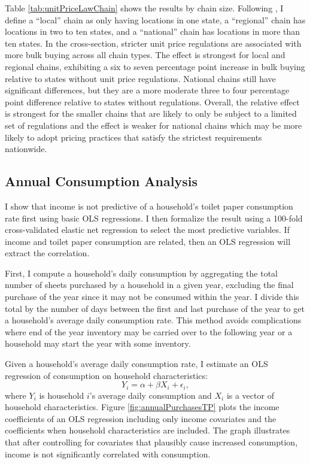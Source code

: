 \documentclass[AER]{AEA_mal}
\begin{document}


Table \ref{tab:unitPriceLawChain} shows the results by chain size. Following \citet{jarmin2009}, I define a ``local'' chain as only having locations in one state, a ``regional'' chain has locations in two to ten states, and a ``national'' chain has locations in more than ten states. In the cross-section, stricter unit price regulations are associated with more bulk buying across all chain types. The effect is strongest for local and regional chains, exhibiting a six to seven percentage point increase in bulk buying relative to states without unit price regulations. National chains still have significant differences, but they are a more moderate three to four percentage point difference relative to states without regulations. Overall, the relative effect is strongest for the smaller chains that are likely to only be subject to a limited set of regulations and the effect is weaker for national chains which may be more likely to adopt pricing practices that satisfy the strictest requirements nationwide.

\subsection{Annual Consumption Analysis}
\label{lasso}
I show that income is not predictive of a household's toilet paper consumption rate first using basic OLS regressions. I then formalize the result using a 100-fold cross-validated elastic net regression to select the most predictive variables. If income and toilet paper consumption are related, then an OLS regression will extract the correlation.

First, I compute a household's daily consumption by aggregating the total number of sheets purchased by a household in a given year, excluding the final purchase of the year since it may not be consumed within the year. I divide this total by the number of days between the first and last purchase of the year to get a household's average daily consumption rate. This method avoids complications where end of the year inventory may be carried over to the following year or a household may start the year with some inventory.

Given a household's average daily consumption rate, I estimate an OLS regression of consumption on household characteristics:
\begin{equation}
\label{eq:annualConsumption}
Y_i = \alpha + \beta X_i + \epsilon_i,
\end{equation}
where $Y_i$ is household $i$'s average daily consumption and $X_i$ is a vector of household characteristics. Figure \ref{fig:annualPurchasesTP} plots the income coefficients of an OLS regression including only income covariates and the coefficients when household characteristics are included. The graph illustrates that after controlling for covariates that plausibly cause increased consumption, income is not significantly correlated with consumption.
\end{document}
